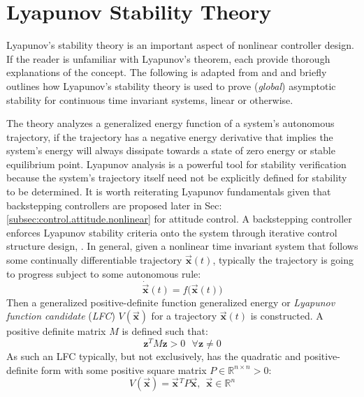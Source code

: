 \section{Lyapunov Stability Theory}
\label{sec:control.lyapunov}
Lyapunov's stability theory is an important aspect of nonlinear controller design. If the reader is unfamiliar with Lyapunov's theorem,  \cite{noteonlyapunov,nonlinearsystems,bojelayupanov} each provide thorough explanations of the concept. The following is adapted from \cite{lyapunovconference} and \cite{lyapunovpaper} and briefly outlines how Lyapunov's stability theory is used to prove (\emph{global}) asymptotic stability for continuous time invariant systems, linear or otherwise. 
\par
The theory analyzes a generalized energy function of a system's autonomous trajectory, if the trajectory has a negative energy derivative that implies the system's energy will always dissipate towards a state of zero energy or stable equilibrium point. Lyapunov analysis is a powerful tool for stability verification because the system's trajectory itself need not be explicitly defined for stability to be determined. It is worth reiterating Lyapunov fundamentals given that backstepping controllers are proposed later in Sec:\ref{subsec:control.attitude.nonlinear} for attitude control.
\newpage
A backstepping controller enforces Lyapunov stability criteria onto the system through iterative control structure design, \cite{backstepping,adaptivebackstep,intelligentbackstep}. In general, given a nonlinear time invariant system that follows some continually differentiable trajectory $\vec{\mathbf{x}}(t)$, typically the trajectory is going to progress subject to some autonomous rule:
\begin{equation}\label{eq:4.17}
\dot{\vec{\mathbf{x}}}(t)=f\big(\vec{\mathbf{x}}(t)\big)
\end{equation}
Then a generalized positive-definite function generalized energy or \emph{Lyapunov function candidate} (\emph{LFC}) $V(\vec{\mathbf{x}})$ for a trajectory $\vec{\mathbf{x}}(t)$ is constructed. A positive definite matrix $M$ is defined such that:
\begin{equation}
\mathbf{z}^TM\mathbf{z} > 0~~~\forall \mathbf{z}\not = 0
\end{equation}
As such an LFC typically, but not exclusively, has the quadratic and positive-definite form with some positive square matrix $P\in\mathbb{R}^{n\times n}>0$:
\begin{equation}
V(\vec{\mathbf{x}})=\vec{\mathbf{x}}\hspace{1pt}^TP\vec{\mathbf{x}},~~\vec{\mathbf{x}}\in\mathbb{R}^{n}
\end{equation}
